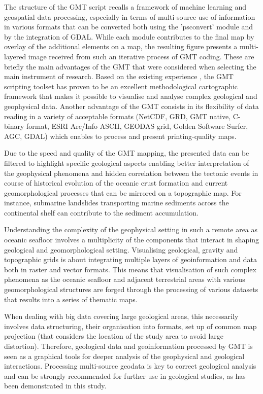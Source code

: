 \documentclass[]{interact}
\begin{document}
The structure of the GMT script recalls a framework of machine learning and geospatial data processing, especially in terms of multi-source use of information in various formats that can be converted both using the 'psconvert' module and by the integration of GDAL. While each module contributes to the final map by overlay of the additional elements on a map, the resulting figure presents a multi-layered image received from such an iterative process of GMT coding. These are briefly the main advantages of the GMT that were considered when selecting the main instrument of research. Based on the existing experience \cite{Lemenkova202017,Lemenkova202105}, the GMT scripting toolset has proven to be an excellent methodological cartographic framework that makes it possible to visualise and analyse complex geological and geophysical data. Another advantage of the GMT consists in its flexibility of data reading in a variety of acceptable formats (NetCDF, GRD, GMT native, C-binary format, ESRI Arc/Info ASCII, GEODAS grid, Golden Software Surfer, AGC, GDAL) which enables to process and present printing-quality maps.

Due to the speed and quality of the GMT mapping, the presented data can be filtered to highlight specific geological aspects enabling better interpretation of the geophysical phenomena and hidden correlation between the tectonic events in course of historical evolution of the oceanic crust formation and current geomorphological processes that can be mirrored on a topographic map. For instance, submarine landslides transporting marine sediments across the continental shelf can contribute to the sediment accumulation.

Understanding the complexity of the geophysical setting in such a remote area as oceanic seafloor involves a multiplicity of the components that interact in shaping geological and geomorphological setting. Visualising geological, gravity and topographic grids is about integrating multiple layers of geoinformation and data both in raster and vector formats. This means that visualisation of such complex phenomena as the oceanic seafloor and adjacent terrestrial areas with various geomorphological structures are forged through the processing of various datasets that results into a series of thematic maps. 

When dealing with big data covering large geological areas, this necessarily involves data structuring, their organisation into formats, set up of common map projection (that considers the location of the study area to avoid large distortion). Therefore, geological data and geoinformation processed by GMT is seen as a graphical tools for deeper analysis of the geophysical and geological interactions. Processing multi-source geodata is key to correct geological analysis and can be strongly recommended for further use in geological studies, as has been demonstrated in this study.
\end{document}
